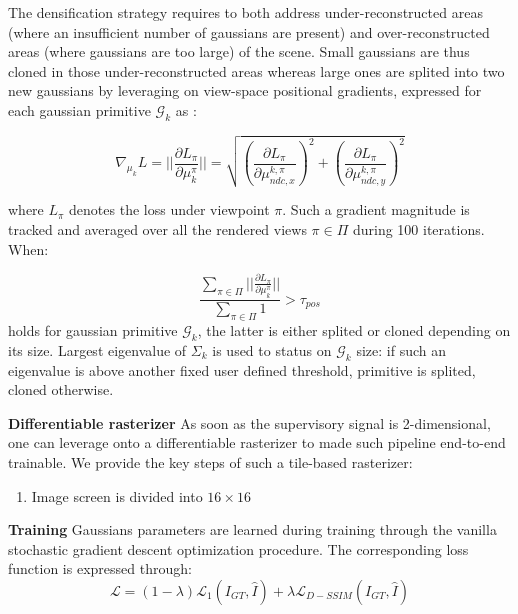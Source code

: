The densification strategy requires to both address under-reconstructed areas (where an insufficient number of gaussians are present) and over-reconstructed areas (where gaussians are too large) of the scene. Small gaussians are thus cloned in those under-reconstructed areas whereas large ones are splited into two new gaussians by leveraging on view-space positional gradients, expressed for each gaussian primitive $\mathcal{G}_{k}$ as : 

\begin{equation}
   \nabla_{\mu_{k}}L= ||\frac{\partial L_{\pi}}{\partial \mu_{k}^{\pi}}|| = \sqrt{\left(\frac{\partial L_{\pi}}{\partial \mu_{ndc,x}^{k,\pi}}\right)^{2} + \left(\frac{\partial L_{\pi}}{\partial \mu_{ndc,y}^{k,\pi}}\right)^{2}}
\end{equation}

where $L_{\pi}$ denotes the loss under viewpoint $\pi$. Such a gradient magnitude is tracked and averaged over all the rendered views $\pi \in \Pi$ during 100 iterations. When: 

\begin{equation}
\frac{\sum \limits_{\pi \in \Pi} ||\frac{\partial L_{\pi}}{\partial \mu_{k}^{\pi}}||}{\sum \limits_{\pi \in \Pi} 1} > \tau_{pos}
\label{eq:adc-original}
\end{equation}
holds for gaussian primitive $\mathcal{G}_{k}$, the latter is either splited or cloned depending on its size. Largest eigenvalue of $\Sigma_{k}$ is used to status on $\mathcal{G}_{k}$ size: if such an eigenvalue is above another fixed user defined threshold, primitive is splited, cloned otherwise. \newline

\noindent \textbf{Differentiable rasterizer} As soon as the supervisory signal is 2-dimensional, one can leverage onto a differentiable rasterizer to made such pipeline end-to-end trainable. We provide the key steps of such a tile-based rasterizer: 

\begin{enumerate}
    \item Image screen is divided into $16\times 16$ 
\end{enumerate}

\noindent \textbf{Training} 
Gaussians parameters are learned during training through the vanilla stochastic gradient descent optimization procedure. The corresponding loss function is expressed through: 
\begin{equation}
    \mathcal{L} = (1-\lambda)\mathcal{L}_{1}(I_{GT},\hat{I}) + \lambda \mathcal{L}_{D-SSIM}(I_{GT},\hat{I})
\end{equation}

